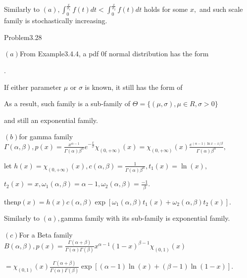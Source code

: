 \documentclass{article}
\begin{document}
Similarly to $\left( a\right) ,\int_{0}^{\frac{x}{\sigma _{1}}%
}f(t)dt<\int_{0}^{\frac{x}{\sigma _{2}}}f(t)dt$ holds for some $x,$ and such
scale family is stochastically increasing.

Problem3.28

$\left( a\right) $From Example3.4.4, a pdf 0f normal distribution has the
form %

.

If either parameter $\mu $ or $\sigma $ is known, it still has the form of


As a result, such family is a sub-family of $\Theta =\{\left( \mu ,\sigma
\right) ,\mu \in R,\sigma >0\}$

and still an exponential family.

$\left( b\right) $for gamma family $\Gamma \left( \alpha ,\beta \right)
,p(x)=\frac{x^{\alpha -1}}{\Gamma \left( \alpha \right) \beta ^{\alpha }}e^{-%
\frac{x}{\beta }}\chi _{(0,+\infty )}\left( x\right) =\chi _{(0,+\infty
)}\left( x\right) \frac{e^{\left( \alpha -1\right) \ln x-x/\beta }}{\Gamma
\left( \alpha \right) \beta ^{\alpha }},$

let $h(x)=\chi _{(0,+\infty )}\left( x\right) ,c\left( \alpha ,\beta \right)
=\frac{1}{\Gamma \left( \alpha \right) \beta ^{\alpha }},t_{1}\left(
x\right) =\ln \left( x\right) ,$

$t_{2}\left( x\right) =x,\omega _{1}\left( \alpha ,\beta \right) =\alpha
-1,\omega _{2}\left( \alpha ,\beta \right) =\frac{-1}{\beta }.$

then\qquad $p\left( x\right) =h\left( x\right) c\left( \alpha ,\beta \right)
\exp \left[ \omega _{1}\left( \alpha ,\beta \right) t_{1}\left( x\right)
+\omega _{2}\left( \alpha ,\beta \right) t_{2}\left( x\right) \right] .$

Similarly to $\left( a\right) ,$gamma family with its sub-family is
exponential family.

$\left( c\right) $For a Beta family $B\left( \alpha ,\beta \right) ,p\left(
x\right) =\frac{\Gamma \left( \alpha +\beta \right) }{\Gamma \left( \alpha
\right) \Gamma \left( \beta \right) }x^{\alpha -1}\left( 1-x\right) ^{\beta
-1}\chi _{(0,1)}(x)$

$=\chi _{(0,1)}(x)\frac{\Gamma \left( \alpha +\beta \right) }{\Gamma \left(
\alpha \right) \Gamma \left( \beta \right) }\exp \left[ \left( \alpha
-1\right) \ln \left( x\right) +\left( \beta -1\right) \ln \left( 1-x\right) %
\right] .$
\end{document}
